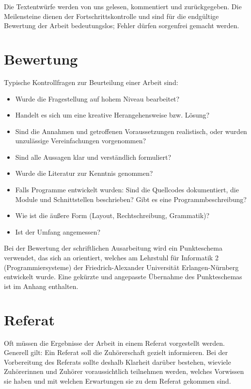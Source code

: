 \documentclass[
    fontsize=12pt,
    headings=small,
    parskip=half,           %
    bibliography=totoc,
    numbers=noenddot,       %
    open=any,               %
    ]{scrreprt}
\begin{document}
Die Textentwürfe werden von uns gelesen, kommentiert und zurückgegeben. Die Meilensteine dienen der Fortschrittskontrolle und sind für die endgültige Bewertung der Arbeit bedeutungslos; Fehler dürfen sorgenfrei gemacht werden.

\section{Bewertung}

Typische Kontrollfragen zur Beurteilung einer Arbeit sind:
\begin{itemize}
	\item Wurde die Fragestellung auf hohem Niveau bearbeitet?
	\item Handelt es sich um eine kreative Herangehensweise bzw. Lösung?
	\item Sind die Annahmen und getroffenen Voraussetzungen realistisch, oder wurden unzulässige Vereinfachungen vorgenommen?
	\item Sind alle Aussagen klar und verständlich formuliert?
	\item Wurde die Literatur zur Kenntnis genommen?
	\item Falls Programme entwickelt wurden: Sind die Quellcodes dokumentiert, die Module und Schnittstellen beschrieben? Gibt es eine Programmbeschreibung?
	\item Wie ist die äußere Form (Layout, Rechtschreibung, Grammatik)?
	\item Ist der Umfang angemessen?
\end{itemize}

Bei der Bewertung der schriftlichen Ausarbeitung wird ein Punkteschema verwendet, das sich an \cite{faui2} orientiert, welches am Lehrstuhl für Informatik 2 (Programmiersysteme) der Friedrich-Alexander Universität Erlangen-Nürnberg entwickelt wurde. Eine gekürzte und angepasste Übernahme des Punkteschemas ist im Anhang enthalten.

\section{Referat}

Oft müssen die Ergebnisse der Arbeit in einem Referat vorgestellt werden. Generell gilt: Ein Referat soll die Zuhörerschaft gezielt informieren. Bei der Vorbereitung des Referats sollte deshalb Klarheit darüber bestehen, wieviele Zuhörerinnen und Zuhörer voraussichtlich teilnehmen werden, welches Vorwissen sie haben und mit welchen Erwartungen sie zu dem Referat gekommen sind.
\end{document}
